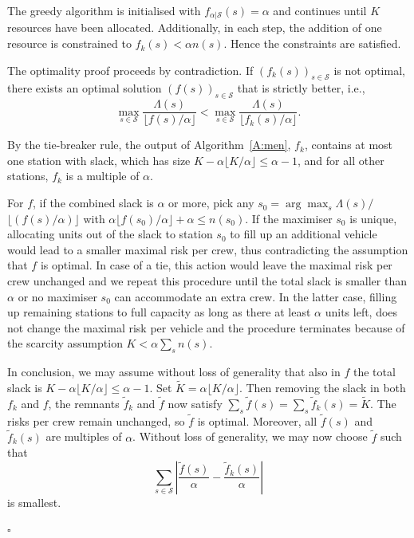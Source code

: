 \documentclass[twoside,11pt]{article}
\newenvironment{proof}[1]{\noindent{\em Proof{#1}:}}{\hfill $\square$ \\}
\begin{document}
\begin{proof}{}
The greedy algorithm is initialised with 
$f_{\alpha |\mathcal{S}}(s) = \alpha$ and 
continues until $K$ resources have been allocated. 
Additionally, in each step, the addition of one resource
is constrained to $f_k(s) < \alpha  n(s)$.
Hence  the constraints are satisfied. 

The optimality proof proceeds by contradiction.  If $(f_k(s))_{s\in\mathcal{S}}$
is not optimal, there exists an optimal solution $(f(s))_{s\in\mathcal{S}}$ that is strictly better, i.e.,
\[
    \max_{s\in\mathcal{S}} \frac{\Lambda(s)}
    { \lfloor f(s) / \alpha \rfloor }
    < \max_{s\in\mathcal{S}} \frac{\Lambda(s)}
     { \lfloor f_k(s) / \alpha \rfloor }.
\]

By the tie-breaker rule, the 
output of Algorithm~\ref{A:men}, $f_k$, contains at 
most one station with slack, which has size
$K - \alpha\lfloor K/\alpha \rfloor \leq \alpha -1$,
and for all other stations, $f_k$ is a multiple of $\alpha$. 

For $f$, if the combined slack is $\alpha$ or more, pick any 
$s_0 = \arg\max_s \Lambda(s) /$ $ \lfloor 
( f(s) / \alpha ) \rfloor$ with 
$\alpha \lfloor f(s_0) / \alpha \rfloor + \alpha \leq n(s_0)$.
If the maximiser $s_0$ is unique, 
allocating units out of the slack to station $s_0$ to 
fill up an additional vehicle 
would lead to a smaller maximal risk per crew, thus 
contradicting the assumption that $f$ is optimal. In case
of a tie, this action would leave the maximal risk per crew 
unchanged and we repeat this procedure
until the total slack is smaller than 
$\alpha$ or no maximiser $s_0$ can accommodate an extra crew.
In the latter case, filling up  remaining stations to
full capacity  as long as there at least $\alpha$ units
left, does not change the maximal risk per vehicle and
the procedure terminates because of the scarcity assumption
$K < \alpha  \sum_{s} n(s)$. 

In conclusion, we may assume without loss 
of generality that also in $f$ the total slack is 
$K - \alpha \lfloor K/\alpha \rfloor \leq \alpha - 1$. 
Set $\tilde K = \alpha \lfloor K/ \alpha \rfloor$. Then 
removing the slack in both $f_k$ and $f$, the remnants 
$\tilde f_k$ and $\tilde f$ now satisfy 
$\sum_s \tilde f(s) = \sum_s \tilde f_k(s) = \tilde K$.
The risks per crew remain unchanged, so $\tilde f$ 
is optimal. Moreover, all $\tilde f(s)$ and $\tilde f_k(s)$ are 
multiples of $\alpha$. Without loss of generality, we may 
now choose $\tilde f$ such that 
\[
\sum_{s\in \mathcal{S}} \left|
 \frac{\tilde f(s)}{\alpha} 
 - \frac{\tilde f_k(s)}{\alpha} 
\right|
\]
is smallest. 


\end{proof}
\end{document}
